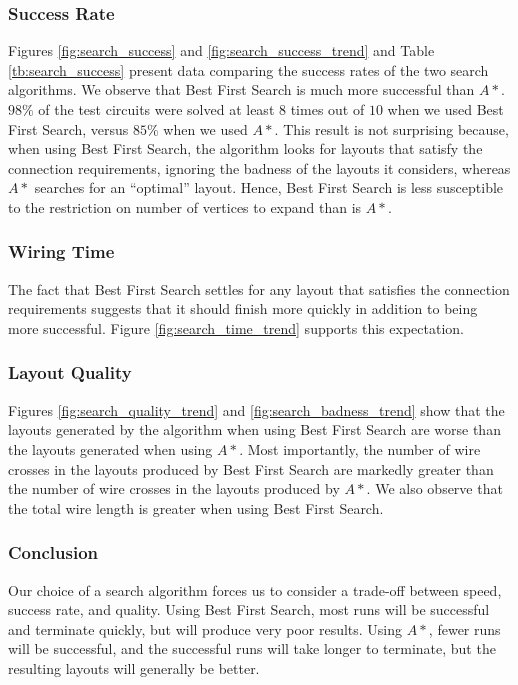 \subsubsection{Success Rate}
Figures \ref{fig:search_success} and
\ref{fig:search_success_trend} and Table \ref{tb:search_success} present
data comparing the success rates of the two search algorithms.
We observe that Best First Search is much more
successful than $A*$. $98\%$ of the test circuits were solved at least $8$ times
out of $10$ when we used Best First Search, versus $85\%$ when we used $A*$.
This result is not surprising because, when using Best First Search,
the algorithm
looks for layouts that satisfy the connection requirements, ignoring the badness
of the layouts it considers, whereas $A*$ searches for an ``optimal'' layout.
Hence, Best First Search is less susceptible to the
restriction on number of vertices to expand than is $A*$.

\subsubsection{Wiring Time}
The fact that Best First Search settles for any layout that satisfies the
connection
requirements suggests that it should finish more quickly in addition to being
more successful. Figure \ref{fig:search_time_trend} supports this
expectation.

\subsubsection{Layout Quality}
Figures \ref{fig:search_quality_trend} and \ref{fig:search_badness_trend} show
that the layouts generated by the
algorithm when using Best First Search are worse than the layouts generated
when using $A*$. Most importantly, the
number of wire crosses in the layouts produced by Best First Search are markedly
greater than the number of wire crosses in the layouts produced by $A*$. We also
observe that the total wire length is greater when using Best First Search.

\subsubsection{Conclusion}
Our choice of a search algorithm forces us to consider a trade-off between
speed, success rate, and quality.
Using Best First Search, most runs will be successful
and terminate quickly, but will produce very poor results. Using $A*$,
fewer runs will be successful, and the successful runs will take longer to
terminate, but the resulting layouts will generally be better.

